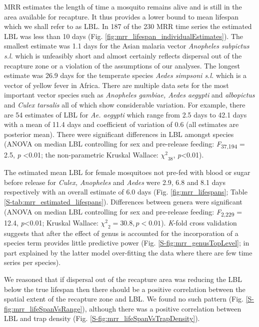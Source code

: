 \documentclass[]{article}
\begin{document}
MRR estimates the length of time a mosquito remains alive and is still
in the area available for recapture. It thus provides a lower bound to mean
lifespan which we shall refer to as LBL. In 187 of the 230 MRR time
series the estimated LBL was less than 10 days (Fig. \ref{fig:mrr_lifespan_individualEstimates}). The smallest
estimate was 1.1 days for the Asian malaria vector
\emph{Anopheles subpictus s.l.} which is unfeasibly short and almost
certainly reflects dispersal out of the recapture zone or a violation of
the assumptions of our analyses. The longest estimate was 26.9 days for
the temperate species \emph{Aedes simpsoni s.l.} which is a vector of
yellow fever in Africa. There are multiple data sets for the most
important vector species such as \emph{Anopheles gambiae, Aedes aegypti}
and \emph{albopictus} and \emph{Culex tarsalis} all of which show
considerable variation. For example, there are 54 estimates of LBL for
\emph{Ae. aegypti} which range from 2.5 days to 42.1 days with a mean of
11.4 days and coefficient of variation of 0.6 (all estimates are posterior mean). There were significant
differences in LBL amongst species (ANOVA on median LBL controlling for
sex and pre-release feeding: \emph{F}\textsubscript{37,194} = 2.5,
\emph{p} \textless{}0.01; the non-parametric Kruskal Wallace:
\({\chi^{2}}_{38}\), \emph{p}\textless{}0.01).

The estimated mean LBL for female mosquitoes not pre-fed with blood or
sugar before release for \emph{Culex, Anopheles} and \emph{Aedes} were
2.9, 6.8 and 8.1 days respectively with an overall estimate of 6.0 days
(Fig. \ref{fig:mrr_lifespans}; Table \ref{S-tab:mrr_estimated_lifespans}). Differences between genera were significant (ANOVA on median
LBL controlling for sex and pre-release feeding:
\emph{F}\textsubscript{2,229} = 12.4, \emph{p}\textless{}0.01; Kruskal
Wallace: \({\chi^{2}}_{2} = 30.8,p < 0.01\)). \emph{K}-fold cross
validation suggests that after the effect of genus is accounted for the
incorporation of a species term provides little predictive power (Fig.
\ref{S-fig:mrr_genusTopLevel}; in part explained by the latter model over-fitting the data where
there are few time series per species).

We reasoned that if dispersal out of the recapture area was reducing the
LBL below the true lifespan then there should be a positive correlation
between the spatial extent of the recapture zone and LBL. We found no
such pattern (Fig. \ref{S-fig:mrr_lifeSpanVsRange}), although there was a positive correlation
between LBL and trap density (Fig. \ref{S-fig:mrr_lifeSpanVsTrapDensity}).
\end{document}
